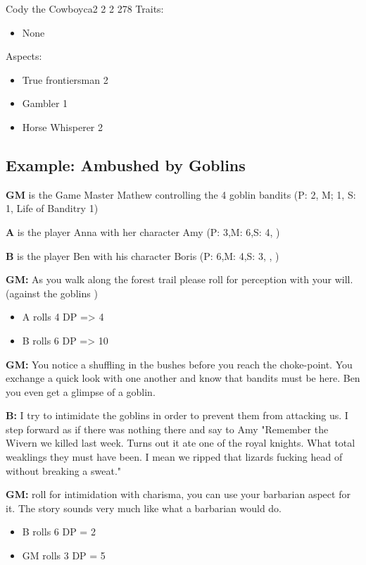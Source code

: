\documentclass[11pt]{article}
\begin{document}
{\begin{npc}{Cody the Cowboy}{ca}{2 2 2 2}{78}
Traits:
\begin{itemize}
\item None
\end{itemize}

\columnbreak

Aspects:
\begin{itemize}
\item True frontiersman 2
\item Gambler 1
\item Horse Whisperer 2
\end{itemize}
\end{npc}
\subsection{Example: Ambushed by Goblins}
\label{sec:org100c905}

\textbf{GM} is the Game Master Mathew controlling the 4 goblin bandits (P: 2, M; 1, S: 1, Life of Banditry 1)

\textbf{A} is the player Anna with her character Amy (P: 3,M: 6,S: 4, )

\textbf{B} is the player Ben with his character Boris (P: 6,M: 4,S: 3, , )

\textbf{GM:} As you walk along the forest trail please roll for perception with your will. (against the goblins ) 
\begin{itemize}
\item A rolls 4 DP => 4
\item B rolls 6 DP => 10
\end{itemize}

\textbf{GM:} You notice a shuffling in the bushes before you reach the choke-point. You exchange a quick look with one another and know that bandits must be here. Ben you even get a glimpse of a goblin.

\textbf{B:} I try to intimidate the goblins in order to prevent them from attacking us. I step forward as if there was nothing there and say to Amy "Remember the Wivern we killed last week. Turns out it ate one of the royal knights. What total weaklings they must have been. I mean we ripped that lizards fucking head of without breaking a sweat."

\textbf{GM:} roll for intimidation with charisma, you can use your barbarian aspect for it. The story sounds very much like what a barbarian would do.
\begin{itemize}
\item B rolls 6 DP = 2
\item GM rolls 3 DP = 5
\end{itemize}

}
\end{document}
